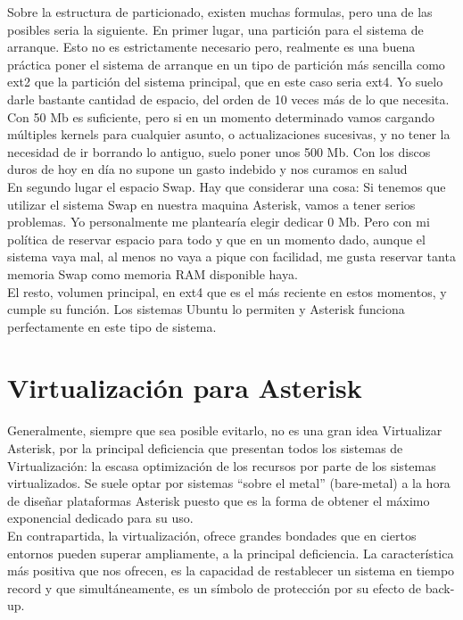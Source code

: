 Sobre la estructura de particionado, existen muchas formulas, pero una de las posibles seria la siguiente. En primer lugar, una partición para el sistema de arranque. Esto no es estrictamente necesario pero, realmente es una buena práctica poner el sistema de arranque en un tipo de partición más sencilla como ext2 que la partición del sistema principal, que en este caso seria ext4. Yo suelo darle bastante cantidad de espacio, del orden de 10 veces más de lo que necesita. Con 50 Mb es suficiente, pero si en un momento determinado vamos cargando múltiples kernels para cualquier asunto, o actualizaciones sucesivas, y no tener la necesidad de ir borrando lo antiguo, suelo poner unos 500 Mb. Con los discos duros de hoy en día no supone un gasto indebido y nos curamos en salud\\

En segundo lugar el espacio Swap. Hay que considerar una cosa: Si tenemos que utilizar el sistema Swap en nuestra maquina Asterisk, vamos a tener serios problemas. Yo personalmente me plantearía elegir dedicar 0 Mb. Pero con mi política de reservar espacio para todo y que en un momento dado, aunque el sistema vaya mal, al menos no vaya a pique con facilidad, me gusta reservar tanta memoria Swap como memoria RAM disponible haya.\\

El resto, volumen principal, en ext4 que es el más reciente en estos momentos, y cumple su función. Los sistemas Ubuntu lo permiten y Asterisk funciona perfectamente en este tipo de sistema.\\

\section{Virtualización para Asterisk}

Generalmente, siempre que sea posible evitarlo, no es una gran idea Virtualizar Asterisk, por la principal deficiencia que presentan todos los sistemas de Virtualización: la escasa optimización de los recursos por parte de los sistemas virtualizados. Se suele optar por sistemas “sobre el metal” (bare-metal) a la hora de diseñar plataformas Asterisk puesto que es la forma de obtener el máximo exponencial dedicado para su uso.\\

En contrapartida, la virtualización, ofrece grandes bondades que en ciertos entornos pueden superar ampliamente, a la principal deficiencia. La característica más positiva que nos ofrecen, es la capacidad de restablecer un sistema en tiempo record y que simultáneamente, es un símbolo de protección por su efecto de back-up.\\

